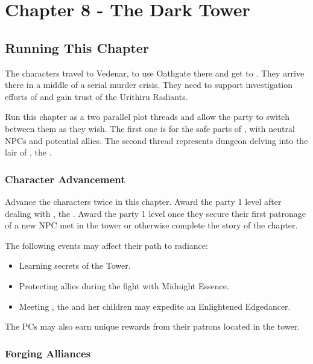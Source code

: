 \chapter{Chapter 8 - The Dark Tower}
\label{chap:chapter8}

\setcounter{section}{-1}
\section{Running This Chapter}
\label{sec:chapter8running}

The characters travel to Vedenar, to use Oathgate there and get to \locationUrithiru{}. They arrive there in a middle of a serial murder crisis. They need to support investigation efforts of \npcShallan{} and gain trust of the Urithiru Radiants.

Run this chapter as a two parallel plot threads and allow the party to switch between them as they wish. The first one is for the safe parts of \locationUrithiru{}, with neutral NPCs and potential allies. The second thread represents dungeon delving into the lair of \npcMidnightMother{}, the \npcMidnightMotherTitle{}.

\subsection{Character Advancement}

Advance the characters twice in this chapter. Award the party 1 level after dealing with \npcMidnightMother{}, the \npcMidnightMotherTitle{}. Award the party 1 level once they secure their first patronage of a new NPC met in the tower or otherwise complete the story of the chapter.

The following events may affect their path to radiance:
\begin{itemize}
	\item Learning secrets of the Tower.
	\item Protecting allies during the fight with Midnight Essence.
	\item Meeting \npcMidnightMother{}, the \npcMidnightMotherTitle{} and her children may expedite an Enlightened Edgedancer.
\end{itemize}

The PCs may also earn unique rewards from their patrons located in the tower.

\subsection{Forging Alliances}

